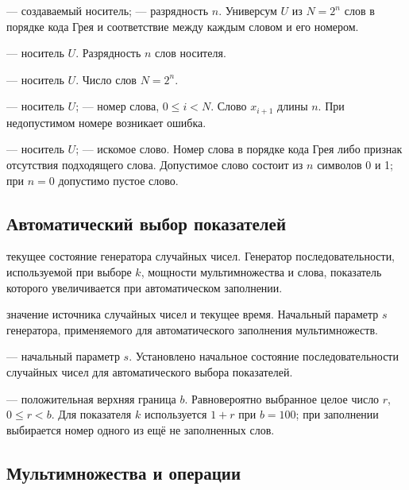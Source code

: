 { — создаваемый носитель;  — разрядность $n$.}
{Универсум $U$ из $N=2^n$ слов в порядке кода Грея и соответствие между каждым словом и его номером.}

{ — носитель $U$.}
{Разрядность $n$ слов носителя.}

{ — носитель $U$.}
{Число слов $N=2^n$.}

{ — носитель $U$;  — номер слова, $0\le i<N$.}
{Слово $x_{i+1}$ длины $n$. При недопустимом номере возникает ошибка.}

{ — носитель $U$;  — искомое слово.}
{Номер слова в порядке кода Грея либо признак отсутствия подходящего слова. Допустимое слово состоит из $n$ символов 0 и 1; при $n=0$ допустимо пустое слово.}

\subsection{Автоматический выбор показателей}

{текущее состояние генератора случайных чисел.}
{Генератор последовательности, используемой при выборе $k$, мощности мультимножества и слова, показатель которого увеличивается при автоматическом заполнении.}

{значение источника случайных чисел и текущее время.}
{Начальный параметр $s$ генератора, применяемого для автоматического заполнения мультимножеств.}

{ — начальный параметр $s$.}
{Установлено начальное состояние последовательности случайных чисел для автоматического выбора показателей.}

{ — положительная верхняя граница $b$.}
{Равновероятно выбранное целое число $r$, $0\le r<b$. Для показателя $k$ используется $1+r$ при $b=100$; при заполнении выбирается номер одного из ещё не заполненных слов.}

\subsection{Мультимножества и операции}
\label{sec:multiset}

